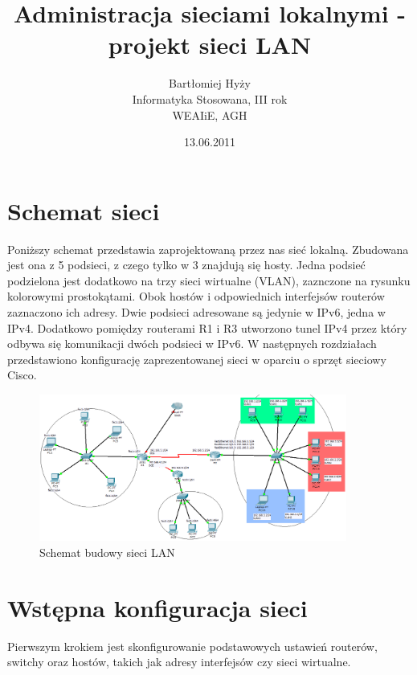 \documentclass[polish,11pt,a4paper,twoside]{article}
\begin{document}
\pagestyle{fancy}
\fancyhf{} %
\fancyfoot[R]{\footnotesize \thepage}
\renewcommand{\headrulewidth}{0pt}
\renewcommand{\footrulewidth}{0pt}

\author{Bartłomiej Hyży\\Informatyka Stosowana, III rok\\WEAIiE, AGH}
\date{13.06.2011}
\title{Administracja sieciami lokalnymi -\\projekt sieci LAN}
\maketitle

\thispagestyle{fancy}

\section{Schemat sieci}
Poniższy schemat przedstawia zaprojektowaną przez nas sieć lokalną. Zbudowana jest ona z 5 podsieci, z czego tylko w 3 znajdują się hosty. Jedna podsieć podzielona jest dodatkowo na trzy sieci wirtualne (VLAN), zaznczone na rysunku kolorowymi prostokątami. Obok hostów i odpowiednich interfejsów routerów zaznaczono ich adresy. Dwie podsieci adresowane są jedynie w IPv6, jedna w IPv4. Dodatkowo pomiędzy routerami R1 i R3 utworzono tunel IPv4 przez który odbywa się komunikacji dwóch podsieci w IPv6. W następnych rozdziałach przedstawiono konfigurację zaprezentowanej sieci w oparciu o sprzęt sieciowy Cisco.
\begin{figure}[!htb]
  \begin{center}
    \includegraphics[width=0.9\textwidth]{schemat.png}
    \caption{Schemat budowy sieci LAN} \label{fig:schemat} 
  \end{center}
\end{figure}

\section{Wstępna konfiguracja sieci}
Pierwszym krokiem jest skonfigurowanie podstawowych ustawień routerów, switchy oraz hostów, takich jak adresy interfejsów czy sieci wirtualne.
\end{document}
